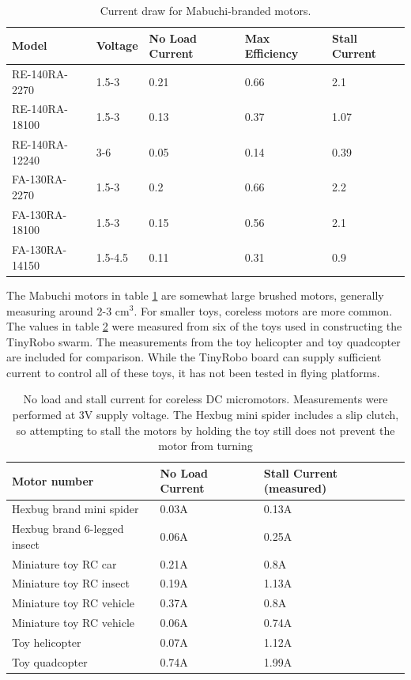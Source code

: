 \documentclass[]{article}
\begin{document}
\begin{table}
	\begin{tabular}{l l l l l}
	Model & Voltage & No Load Current & Max Efficiency & Stall Current\\
	\hline
	RE-140RA-2270 & 1.5-3 & 0.21 & 0.66 & 2.1 \\
	RE-140RA-18100 & 1.5-3 & 0.13 & 0.37 & 1.07 \\
	RE-140RA-12240 & 3-6 & 0.05 & 0.14 & 0.39 \\
	FA-130RA-2270 & 1.5-3 & 0.2 & 0.66 & 2.2\\
	FA-130RA-18100 & 1.5-3 & 0.15 & 0.56 & 2.1\\
	FA-130RA-14150 & 1.5-4.5 & 0.11 & 0.31 & 0.9\\
	\end{tabular}
	\caption{Current draw for Mabuchi-branded motors.}
	\label{tab:properBrandedMotors}
\end{table}

The Mabuchi motors in table \ref{tab:properBrandedMotors} are somewhat large brushed motors, generally measuring around 2-3 cm$^3$. 
For smaller toys, coreless motors are more common. 
The values in table \ref{tab:coreless} were measured from six of the toys used in constructing the TinyRobo swarm.
The measurements from the toy helicopter and toy quadcopter are included for comparison.
While the TinyRobo board can supply sufficient current to control all of these toys, it has not been tested in flying platforms.

\begin{table}
	\begin{tabular}{l l l}
	Motor number & No Load Current & Stall Current (measured)\\
	\hline 
	Hexbug brand mini spider & 0.03A & 0.13A \\
	Hexbug brand 6-legged insect & 0.06A & 0.25A \\
	Miniature toy RC car & 0.21A & 0.8A \\
	Miniature toy RC insect & 0.19A & 1.13A \\
	Miniature toy RC vehicle & 0.37A & 0.8A \\
	Miniature toy RC vehicle & 0.06A & 0.74A \\
	Toy helicopter & 0.07A & 1.12A \\
	Toy quadcopter & 0.74A & 1.99A \\
	\end{tabular}
	\caption{No load and stall current for coreless DC micromotors. Measurements were performed at 3V supply voltage. The Hexbug mini spider includes a slip clutch, so attempting to stall the motors by holding the toy still does not prevent the motor from turning}
	\label{tab:coreless}
\end{table}
\end{document}
